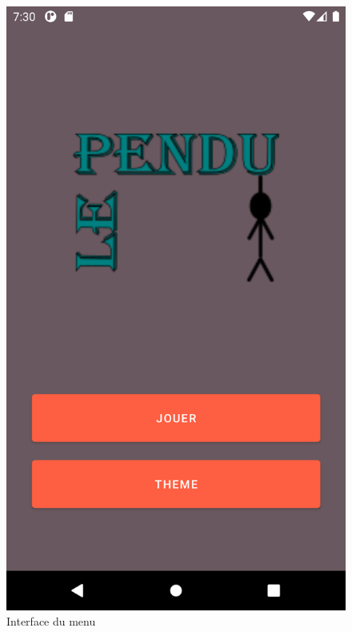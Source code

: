 \documentclass{article}
\begin{document}
\begin{figure}[h!]
\centering
\color{black}
\includegraphics[scale=0.08]{menu.png}
\caption{Interface du menu }
\label{fig:menu}
\end{figure}
\newpage
\end{document}
